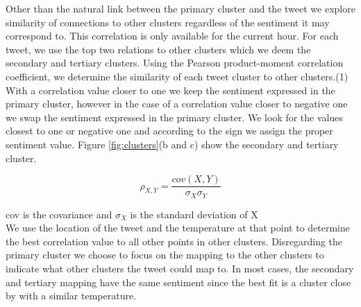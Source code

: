 \documentclass[journal]{vgtc}                %
\begin{document}
Other than the natural link between the primary cluster and the tweet we explore similarity of connections to other clusters regardless of the sentiment it may correspond to. This correlation is only available for the current hour. For each tweet, we use the top two relations to other clusters which we deem the secondary and tertiary clusters. Using the Pearson product-moment correlation coefficient, we determine the similarity of each tweet cluster to other clusters.(1) With a correlation value closer to one we keep the sentiment expressed in the primary cluster, however in the case of a correlation value closer to negative one we swap the sentiment expressed in the primary cluster. We look for the values closest to one or negative one and according to the sign we assign the proper sentiment value. Figure \ref{fig:clusters}(b and c) show the secondary and tertiary cluster.

\begin{equation}
\label{eq:pearson}
\rho_{X,Y}=\frac{cov(X,Y)}{\sigma_{X}\sigma_{Y}}
\end{equation}

cov is the covariance and $\sigma_{X}$ is the standard deviation of X \\

We use the location of the tweet and the temperature at that point to determine the best correlation value to all other points in other clusters. Disregarding the primary cluster we choose to focus on the mapping to the other clusters to indicate what other clusters the tweet could map to. In most cases, the secondary and tertiary mapping have the same sentiment since the best fit is a cluster close by with a similar temperature. 
\end{document}
